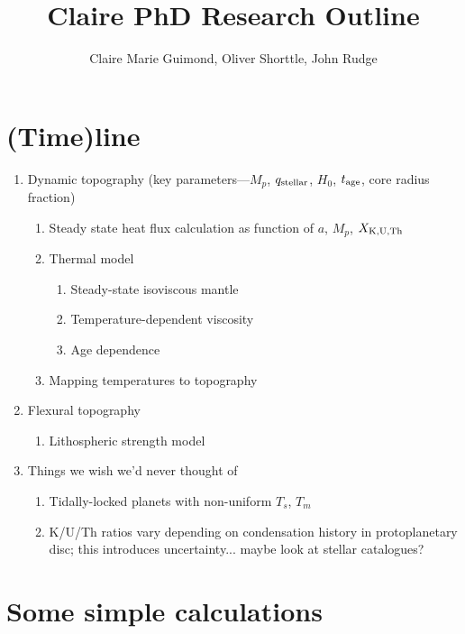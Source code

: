 \documentclass[10pt,a4paper]{article}
\author{Claire Marie Guimond, Oliver Shorttle, John Rudge}
\title{Claire PhD Research Outline}
\begin{document}
\maketitle

\section{(Time)line}
\begin{enumerate}
\item Dynamic topography (key parameters---$M_p$, $q_{\rm stellar}$, $H_0$, $t_{\rm age}$, core radius fraction) 
	\begin{enumerate}
	\item Steady state heat flux calculation as function of $a$, $M_p$, $X_{\rm K, U, Th}$
	\item Thermal model
	
		\begin{enumerate}
		
		\item Steady-state isoviscous mantle
		\item Temperature-dependent viscosity
		\item Age dependence
		\end{enumerate}
	\item Mapping temperatures to topography
	\end{enumerate}
		
\item Flexural topography
	\begin{enumerate}
	\item Lithospheric strength model
	\end{enumerate}
	
\item Things we wish we'd never thought of
	\begin{enumerate}
	\item Tidally-locked planets with non-uniform $T_s$, $T_m$
	\item K/U/Th ratios vary depending on condensation history in protoplanetary disc; this introduces uncertainty... maybe look at stellar catalogues?
	\end{enumerate}
	
\end{enumerate}
	
\section{Some simple calculations}
\end{document}
